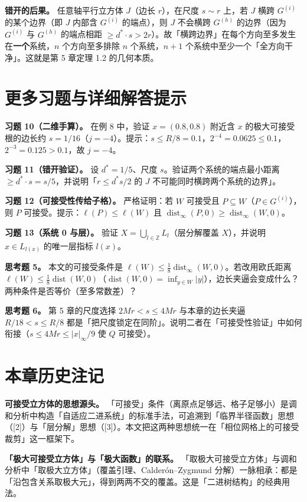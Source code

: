 \documentclass[a4paper,11pt,openany]{ctexbook}
\numberwithin{equation}{chapter}
\numberwithin{figure}{chapter}
\numberwithin{table}{chapter}
\begin{document}
\textbf{错开的后果。} 任意轴平行立方体 $J$（边长 $r$），在尺度 $s\sim r$ 上，若 $J$ 横跨 $G^{(i)}$ 的某个边界（即 $J$ 内部含 $G^{(i)}$ 的端点），则 $J$ 不会横跨 $G^{(h)}$ 的边界（因为 $G^{(i)}$ 与 $G^{(h)}$ 的端点相距 $\ge d^*\cdot s>2r$）。故「横跨边界」在每个方向至多发生在\textbf{一个}系统，$n$ 个方向至多排除 $n$ 个系统，$n+1$ 个系统中至少一个「全方向干净」。这就是第 5 章定理 1.2 的几何本质。

\section{更多习题与详细解答提示}

\textbf{习题 10（二维手算）。} 在例 8 中，验证 $x=(0.8,0.8)$ 附近含 $x$ 的极大可接受根的边长约 $s=1/16$（$j=-4$）。提示：$s\le R/8=0.1$，$2^{-4}=0.0625\le0.1$，$2^{-3}=0.125>0.1$，故 $j=-4$。

\textbf{习题 11（错开验证）。} 设 $d^*=1/5$、尺度 $s$。验证两个系统的端点最小距离 $\ge d^*\cdot s=s/5$，并说明「$r\le d^*s/2$ 的 $J$ 不可能同时横跨两个系统的边界」。

\textbf{习题 12（可接受性传给子格）。} 严格证明：若 $W$ 可接受且 $P\subseteq W$（$P\in G^{(i)}$），则 $P$ 可接受。提示：$\ell(P)\le\ell(W)$ 且 $\operatorname{dist}_\infty(P,0)\ge\operatorname{dist}_\infty(W,0)$。

\textbf{习题 13（系统 0 与层）。} 验证 $X=\bigcup_{l\in\mathbb Z}L_l$（层分解覆盖 $X$），并说明 $x\in L_{l(x)}$ 的唯一层指标 $l(x)$。

\textbf{思考题 5。} 本文的可接受条件是 $\ell(W)\le\frac18\operatorname{dist}_\infty(W,0)$。若改用欧氏距离 $\ell(W)\le\frac18\operatorname{dist}(W,0)$（$\operatorname{dist}(W,0)=\inf_{y\in W}|y|$），边长夹逼会变成什么？两种条件是否等价（至多常数差）？

\textbf{思考题 6。} 第 5 章的尺度选择 $2Mr<s\le4Mr$ 与本章的边长夹逼 $R/18<s\le R/8$ 都是「把尺度锁定在同阶」。说明二者在「可接受性验证」中如何衔接（$s\le4Mr\le|x|_\infty/9$ 使 $Q$ 可接受）。

\section{本章历史注记}

\textbf{可接受立方体的思想源头。} 「可接受」条件（离原点足够远、格子足够小）是调和分析中构造「自适应二进系统」的标准手法，可追溯到「临界半径函数」思想（[2]）与「层分解」思想（[3]）。本文把这两种思想统一在「相位网格上的可接受裁剪」这一框架下。

\textbf{「极大可接受立方体」与「极大函数」的联系。} 「取极大可接受立方体」与调和分析中「取极大立方体」（覆盖引理、Calderón–Zygmund 分解）一脉相承：都是「沿包含关系取极大元」，得到两两不交的覆盖。这是「二进树结构」的经典用法。
\end{document}
